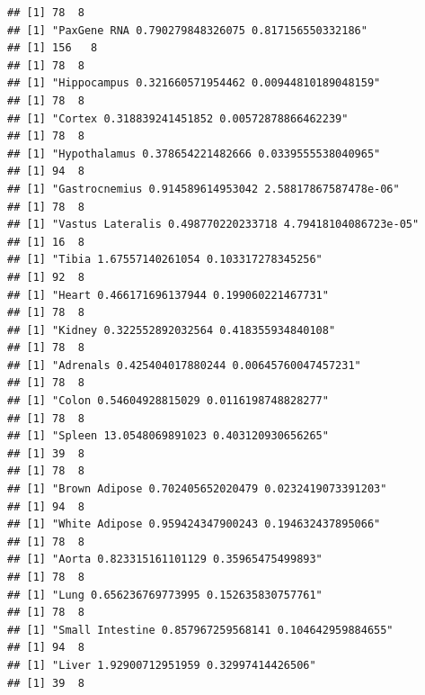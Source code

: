 \documentclass[]{article}
\newenvironment{Shaded}{\begin{snugshade}}{\end{snugshade}}
\newcommand{\KeywordTok}[1]{\textcolor[rgb]{0.13,0.29,0.53}{\textbf{#1}}}
\newcommand{\DataTypeTok}[1]{\textcolor[rgb]{0.13,0.29,0.53}{#1}}
\newcommand{\DecValTok}[1]{\textcolor[rgb]{0.00,0.00,0.81}{#1}}
\newcommand{\StringTok}[1]{\textcolor[rgb]{0.31,0.60,0.02}{#1}}
\newcommand{\OperatorTok}[1]{\textcolor[rgb]{0.81,0.36,0.00}{\textbf{#1}}}
\newcommand{\NormalTok}[1]{#1}
\begin{document}
\begin{Shaded}
\end{Shaded}

\begin{verbatim}
## [1] 78  8
## [1] "PaxGene RNA 0.790279848326075 0.817156550332186"
## [1] 156   8
## [1] 78  8
## [1] "Hippocampus 0.321660571954462 0.00944810189048159"
## [1] 78  8
## [1] "Cortex 0.318839241451852 0.00572878866462239"
## [1] 78  8
## [1] "Hypothalamus 0.378654221482666 0.0339555538040965"
## [1] 94  8
## [1] "Gastrocnemius 0.914589614953042 2.58817867587478e-06"
## [1] 78  8
## [1] "Vastus Lateralis 0.498770220233718 4.79418104086723e-05"
## [1] 16  8
## [1] "Tibia 1.67557140261054 0.103317278345256"
## [1] 92  8
## [1] "Heart 0.466171696137944 0.199060221467731"
## [1] 78  8
## [1] "Kidney 0.322552892032564 0.418355934840108"
## [1] 78  8
## [1] "Adrenals 0.425404017880244 0.00645760047457231"
## [1] 78  8
## [1] "Colon 0.54604928815029 0.0116198748828277"
## [1] 78  8
## [1] "Spleen 13.0548069891023 0.403120930656265"
## [1] 39  8
## [1] 78  8
## [1] "Brown Adipose 0.702405652020479 0.0232419073391203"
## [1] 94  8
## [1] "White Adipose 0.959424347900243 0.194632437895066"
## [1] 78  8
## [1] "Aorta 0.823315161101129 0.35965475499893"
## [1] 78  8
## [1] "Lung 0.656236769773995 0.152635830757761"
## [1] 78  8
## [1] "Small Intestine 0.857967259568141 0.104642959884655"
## [1] 94  8
## [1] "Liver 1.92900712951959 0.32997414426506"
## [1] 39  8
\end{verbatim}
\end{document}
